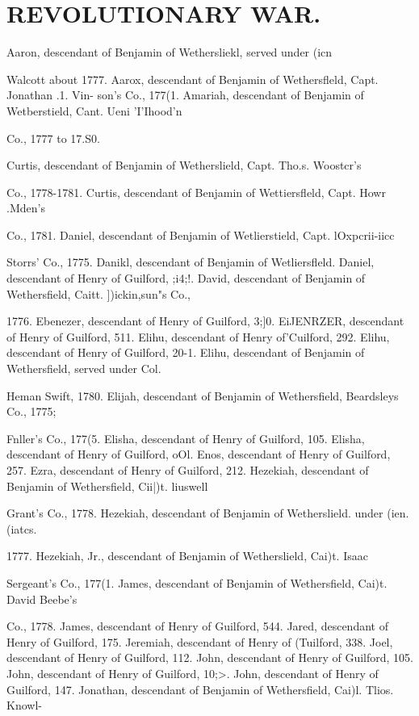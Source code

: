 \documentclass{book}
\begin{document}
\chapter{REVOLUTIONARY WAR.}
Aaron, descendant of Benjamin of Wethersliekl, served under (icn 

Walcott about 1777. 
Aarox, descendant of Benjamin of Wethersfleld, Capt. Jonathan .1. Vin- 
son's Co., 177(1. 
Amariah, descendant of Benjamin of Wetberstield, Cant. Ueni 'I'Ihood'n 

Co., 1777 to 17.S0.  

Curtis, descendant of Benjamin of Wetherslield, Capt. Tho.s. Woostcr's 

Co., 1778-1781. 
Curtis, descendant of Benjamin of Wettiersfleld, Capt. Howr .Mden's 

Co., 1781. 
Daniel, descendant of Benjamin of Wetlierstield, Capt. lOxpcrii-iicc 

Storrs' Co., 1775. 
Danikl, descendant of Benjamin of Wetliersfleld. 
Daniel, descendant of Henry of Guilford, ;i4;!. 
David, descendant of Benjamin of Wethersfield, Caitt. ])ickin,sun"s Co., 

1776. 
Ebenezer, descendant of Henry of Guilford, 3;]0. 
EiJENRZER, descendant of Henry of Guilford, 511. 
Elihu, descendant of Henry of'Cuilford, 292. 
Elihu, descendant of Henry of Guilford, 20-1. 
Elihu, descendant of Benjamin of Wethersfield, served under Col. 

Heman Swift, 1780. 
Elijah, descendant of Benjamin of Wethersfield, Beardsleys Co., 1775; 

Fnller's Co., 177(5. 
Elisha, descendant of Henry of Guilford, 105. 
Elisha, descendant of Henry of Guilford, oOl. 
Enos, descendant of Henry of Guilford, 257. 
Ezra, descendant of Henry of Guilford, 212. 
Hezekiah, descendant of Benjamin of Wethersfield, Cii|)t. liuswell 

Grant's Co., 1778. 
Hezekiah, descendant of Benjamin of Wetherslield. under (ien. (iatcs. 

1777. 
Hezekiah, Jr., descendant of Benjamin of Wetherslield, Cai)t. Isaac 

Sergeant's Co., 177(1. 
James, descendant of Benjamin of Wethersfield, Cai)t. David Beebe's 

Co., 1778. 
James, descendant of Henry of Guilford, 544. 
Jared, descendant of Henry of Guilford, 175. 
Jeremiah, descendant of Henry of (Tuilford, 338. 
Joel, descendant of Henry of Guilford, 112. 
John, descendant of Henry of Guilford, 105. 
John, descendant of Henry of Guilford, 10;>. 
John, descendant of Henry of Guilford, 147. 
Jonathan, descendant of Benjamin of Wethersfield, Cai)l. Tlios. Knowl- 
\end{document}
